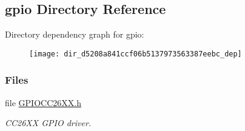 \subsection{gpio Directory Reference}
\label{dir_d5208a841ccf06b5137973563387eebc}
Directory dependency graph for gpio\+:
\nopagebreak
\begin{figure}[H]
\begin{center}
\leavevmode
\texttt{[image: dir\_d5208a841ccf06b5137973563387eebc\_dep]}
\end{center}
\end{figure}
\subsubsection*{Files}
\begin{DoxyCompactItemize}
\item 
file \hyperlink{_g_p_i_o_c_c26_x_x_8h}{G\+P\+I\+O\+C\+C26\+X\+X.\+h}
\begin{DoxyCompactList}\small\item\em C\+C26\+X\+X G\+P\+I\+O driver. \end{DoxyCompactList}\end{DoxyCompactItemize}
